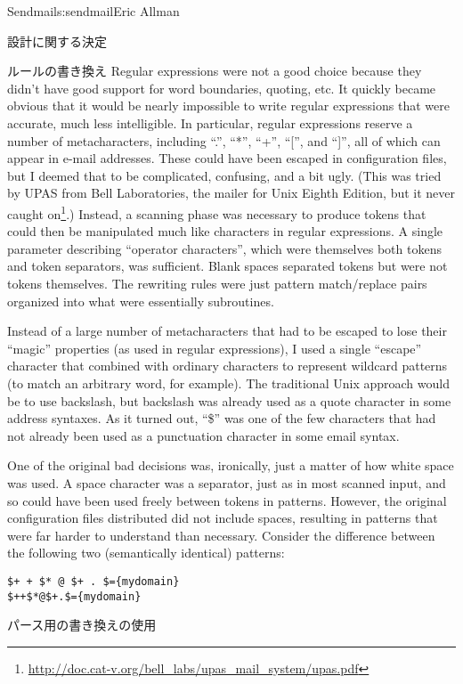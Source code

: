 \begin{aosachapter}{Sendmail}{s:sendmail}{Eric Allman}
\begin{aosasect1}{設計に関する決定}
\begin{aosasect2}{ルールの書き換え}
Regular expressions were not a good choice because they didn't have
good support for word boundaries, quoting, etc. It quickly became
obvious that it would be nearly impossible to write regular
expressions that were accurate, much less intelligible. In particular,
regular expressions reserve a number of metacharacters, including
``.'', ``*'', ``+'', ``{[}'', and ``{]}'', all of which can appear in
e-mail addresses. These could have been escaped in configuration files,
but I deemed that to be complicated, confusing, and a bit
ugly. (This was tried by UPAS from Bell Laboratories, the mailer for
Unix Eighth Edition, but it never caught
on\footnote{\url{http://doc.cat-v.org/bell_labs/upas_mail_system/upas.pdf}}.)
Instead, a scanning phase was necessary to produce tokens that could
then be manipulated much like characters in regular expressions. A
single parameter describing ``operator characters'', which were
themselves both tokens and token separators, was sufficient. Blank
spaces separated tokens but were not tokens themselves. The rewriting
rules were just pattern match/replace pairs organized into what were
essentially subroutines.

Instead of a large number of metacharacters that had to be escaped to
lose their ``magic'' properties (as used in regular expressions), I
used a single ``escape'' character that combined with ordinary
characters to represent wildcard patterns (to match an arbitrary word,
for example).  The traditional Unix approach would be to use
backslash, but backslash was already used as a quote character in some
address syntaxes. As it turned out, ``\$'' was one of the few
characters that had not already been used as a punctuation character
in some email syntax.

One of the original bad decisions was, ironically, just a matter of how white
space was used. A space character was a separator, just as in most
scanned input, and so could have been used freely between tokens in
patterns. However, the original configuration files distributed did
not include spaces, resulting in patterns that were far harder to
understand than necessary. Consider the difference between the
following two (semantically identical) patterns:

\begin{verbatim}
$+ + $* @ $+ . $={mydomain}
$++$*@$+.$={mydomain}
\end{verbatim}

\end{aosasect2}

\begin{aosasect2}{パース用の書き換えの使用}


\end{aosasect2}
\end{aosasect1}
\end{aosachapter}
